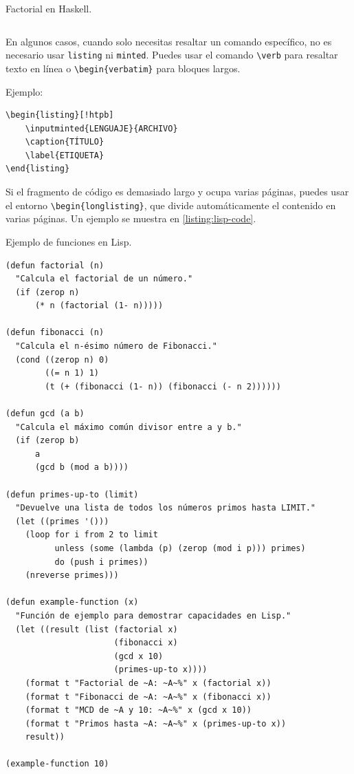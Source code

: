 \begin{listing}[!htpb]
\caption{Factorial en Haskell.}
\label{listing:haskell-code}
\inputminted{haskell}{Code/Factorial.hs}
\end{listing}

En algunos casos, cuando solo necesitas resaltar un comando específico, no es necesario usar \verb|listing| ni \verb|minted|. Puedes usar el comando \verb|\verb| para resaltar texto en línea o \verb|\begin{verbatim}| para bloques largos.

Ejemplo:

\begin{verbatim}
\begin{listing}[!htpb]
    \inputminted{LENGUAJE}{ARCHIVO}
    \caption{TÍTULO}
    \label{ETIQUETA}
\end{listing}
\end{verbatim}

Si el fragmento de código es demasiado largo y ocupa varias páginas, puedes usar el entorno \verb|\begin{longlisting}|, que divide automáticamente el contenido en varias páginas. Un ejemplo se muestra en \autoref{listing:lisp-code}.

\begin{longlisting}
\caption{Ejemplo de funciones en Lisp.}
\label{listing:lisp-code}
\begin{verbatim}
(defun factorial (n)
  "Calcula el factorial de un número."
  (if (zerop n)
      (* n (factorial (1- n)))))

(defun fibonacci (n)
  "Calcula el n-ésimo número de Fibonacci."
  (cond ((zerop n) 0)
        ((= n 1) 1)
        (t (+ (fibonacci (1- n)) (fibonacci (- n 2))))))

(defun gcd (a b)
  "Calcula el máximo común divisor entre a y b."
  (if (zerop b)
      a
      (gcd b (mod a b))))

(defun primes-up-to (limit)
  "Devuelve una lista de todos los números primos hasta LIMIT."
  (let ((primes '()))
    (loop for i from 2 to limit
          unless (some (lambda (p) (zerop (mod i p))) primes)
          do (push i primes))
    (nreverse primes)))

(defun example-function (x)
  "Función de ejemplo para demostrar capacidades en Lisp."
  (let ((result (list (factorial x)
                      (fibonacci x)
                      (gcd x 10)
                      (primes-up-to x))))
    (format t "Factorial de ~A: ~A~%" x (factorial x))
    (format t "Fibonacci de ~A: ~A~%" x (fibonacci x))
    (format t "MCD de ~A y 10: ~A~%" x (gcd x 10))
    (format t "Primos hasta ~A: ~A~%" x (primes-up-to x))
    result))

(example-function 10)
\end{verbatim}
\end{longlisting}

